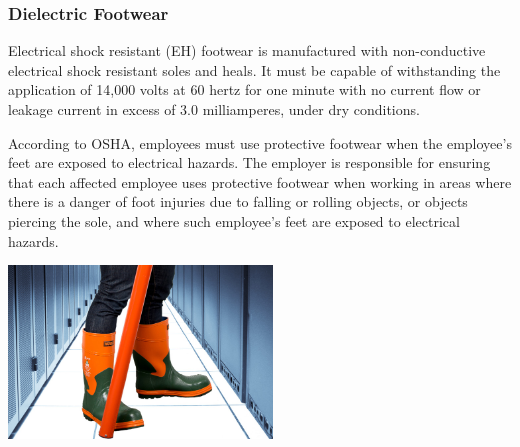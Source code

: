 \documentclass[11pt,a4paper]{article}
\begin{document}
\subsubsection*{Dielectric Footwear}
Electrical shock resistant (EH) footwear is manufactured with non-conductive electrical shock resistant soles and heals. It must be capable of withstanding the application of 14,000 volts at 60 hertz for one minute with no current flow or leakage current in excess of 3.0 milliamperes, under dry conditions.

According to OSHA, employees must use protective footwear when the employee's feet are exposed to electrical hazards. The employer is responsible for ensuring that each affected employee uses protective footwear when working in areas where there is a danger of foot injuries due to falling or rolling objects, or objects piercing the sole, and where such employee's feet are exposed to electrical hazards.
\begin{center}
  \includegraphics[width=7cm]{boots.jpg}\par
  \end{center}
\end{document}
